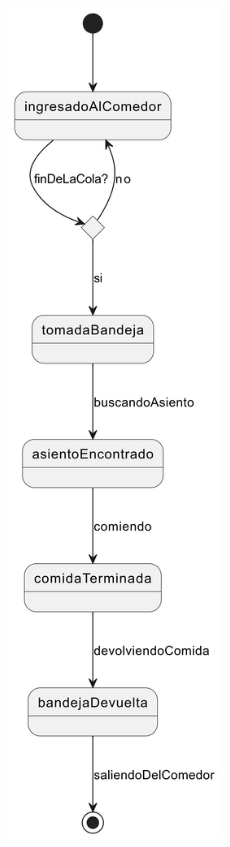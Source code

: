 \documentclass[12pt]{article}
\begin{document}
\begin{center}
	\includegraphics[height=22cm]{Domain Modeling [01] - Status Diagram: Users.png}
\end{center}
\end{document}
